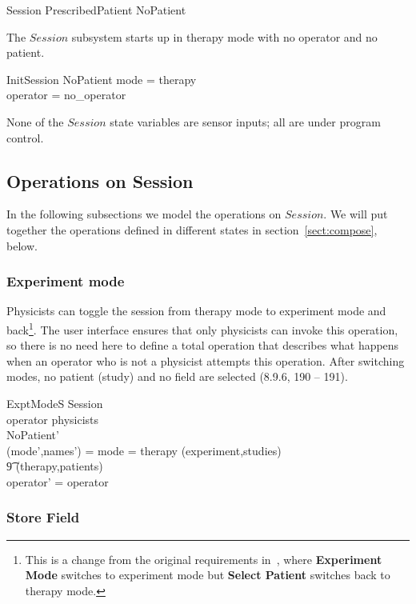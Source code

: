 \begin{zed} Session  PrescribedPatient \lor NoPatient \end{zed}
The $Session$ subsystem starts up in therapy mode with no operator and
no patient.

\begin{schema}{InitSession}
	NoPatient
\where
	mode = therapy \\
	operator = no\_operator \\
\end{schema}
None of the $Session$ state variables are sensor inputs; all are under
program control.

\subsection{Operations on Session}

In the following subsections we model the operations on $Session$.  We
will put together the operations defined in different states in
section~\ref{sect:compose}, below.

\subsubsection{Experiment mode} \label{sect:expt-mode-s}

Physicists can toggle the session from therapy mode to experiment mode
and back\footnote{This is a change from the original requirements
in~\cite{jacky90d}, where {\bf Experiment Mode} switches to experiment
mode but {\bf Select Patient} switches back to therapy mode.}. The
user interface ensures that only physicists can invoke this operation,
so there is no need here to define a total operation that describes
what happens when an operator who is not a physicist attempts this
operation.  After switching modes, no patient (study) and no field are
selected (8.9.6, 190 -- 191).

\begin{schema}{ExptModeS}
	\Delta Session \\
\where
	operator \in physicists \\
	NoPatient' \\
	(mode',names') = \IF mode = therapy \THEN (experiment,studies) \\
\t9						\ELSE (therapy,patients) \\
	operator' = operator
\end{schema}

\subsubsection{Store Field}


